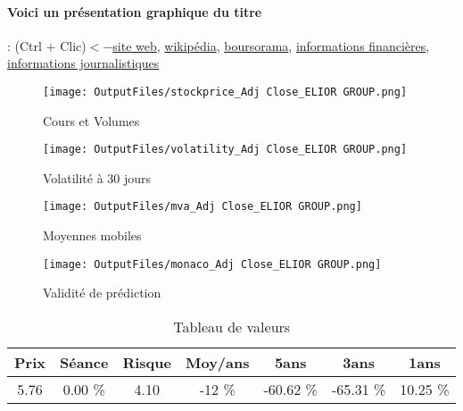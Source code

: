 \documentclass[11pt,a4paper]{report}%
\begin{document}
\paragraph{Voici un présentation graphique du titre} : (Ctrl + Clic)$<-$\href{https://www.eliorgroup.com/fr/finance/finance}{site web}, \href{https://fr.wikipedia.org/wiki/Elior_Group}{wikipédia}, \href{https://www.boursorama.com/cours/1rPELIOR}{boursorama}, \href{https://www.qwant.com/?q=site:https:%2f%2fwww.easybourse.com%2faction-societe%2fELIOR-GROUP&t=web&client=ext-firefox-hp}{informations financières}, \href{https://bourse.lerevenu.com/cours-de-bourse/fiche-valeur-synthese/ELIOR-GROUP/ELIOR-FR}{informations journalistiques}
\begin{figure}[!htb]
   \begin{minipage}{0.5\textwidth}
     \centering
     \texttt{[image: OutputFiles/stockprice\_Adj Close\_ELIOR GROUP.png]}
     \caption{Cours et Volumes}\label{Fig:price_ELIOR GROUP}
   \end{minipage}\hfill
   \begin{minipage}{0.5\textwidth}
     \centering
     \texttt{[image: OutputFiles/volatility\_Adj Close\_ELIOR GROUP.png]}
     \caption{Volatilité à 30 jours}\label{Fig:volat_ELIOR GROUP}
   \end{minipage}
\end{figure}
\begin{figure}[!htb]
   \begin{minipage}{0.5\textwidth}
     \centering
     \texttt{[image: OutputFiles/mva\_Adj Close\_ELIOR GROUP.png]}
     \caption{Moyennes mobiles}\label{Fig:mva_ELIOR GROUP}
   \end{minipage}\hfill
   \begin{minipage}{0.5\textwidth}
     \centering
     \texttt{[image: OutputFiles/monaco\_Adj Close\_ELIOR GROUP.png]}
     \caption{Validité de prédiction}\label{Fig:prediction_ELIOR GROUP}
   \end{minipage}
\end{figure}

\begin{table}[H]
  \centering
    \begin{tabular}{|c|c|c|c|c|c|c|}
    \hline
    Prix & Séance & Risque  & Moy/ans & 5ans & 3ans & 1ans \\
    \hline
    5.76 &    0.00 \%    & 4.10 & -12 \% & -60.62 \% & -65.31 \% & 10.25 \% \\
    \hline
    \end{tabular}%
        \label{tab:table_ELIOR GROUP}%
      \caption{Tableau de valeurs}
\end{table}%
\end{document}
